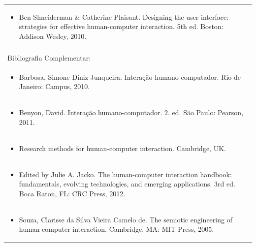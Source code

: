 \documentclass[11pt]{article}
\begin{document}
\begin{center}
\begin{longtable}{|p{4cm}|p{4cm}|p{4cm}|p{4cm}|}
\multicolumn{4}{|p{\dimexpr 16cm + 6\tabcolsep\relax}|}{\begin{itemize}\item Ben Shneiderman \& Catherine Plaisant. Designing the user interface: strategies for effective human-computer interaction. 5th ed. Boston: Addison Wesley, 2010.\end{itemize}}\\
\multicolumn{4}{|p{16cm}|}{}\\
\hline
\multicolumn{4}{|p{16cm}|}{Bibliografia Complementar:}\\*
\multicolumn{4}{|p{\dimexpr 16cm + 6\tabcolsep\relax}|}{\begin{itemize}\item Barbosa, Simone Diniz Junqueira. Interação humano-computador. Rio de Janeiro: Campus, 2010.\end{itemize}}\\
\multicolumn{4}{|p{\dimexpr 16cm + 6\tabcolsep\relax}|}{\begin{itemize}\item Benyon, David. Interação humano-computador. 2. ed. São Paulo: Pearson, 2011.\end{itemize}}\\
\multicolumn{4}{|p{\dimexpr 16cm + 6\tabcolsep\relax}|}{\begin{itemize}\item Research methods for human-computer interaction. Cambridge, UK.\end{itemize}}\\
\multicolumn{4}{|p{\dimexpr 16cm + 6\tabcolsep\relax}|}{\begin{itemize}\item Edited by Julie A. Jacko. The human-computer interaction handbook: fundamentals, evolving technologies, and emerging applications. 3rd ed. Boca Raton, FL: CRC Press, 2012.\end{itemize}}\\
\multicolumn{4}{|p{\dimexpr 16cm + 6\tabcolsep\relax}|}{\begin{itemize}\item Souza, Clarisse da Silva Vieira Camelo de. The semiotic engineering of human-computer interaction. Cambridge, MA: MIT Press, 2005.\end{itemize}}\\
\hline
\end{longtable}
\end{center}
\end{document}
